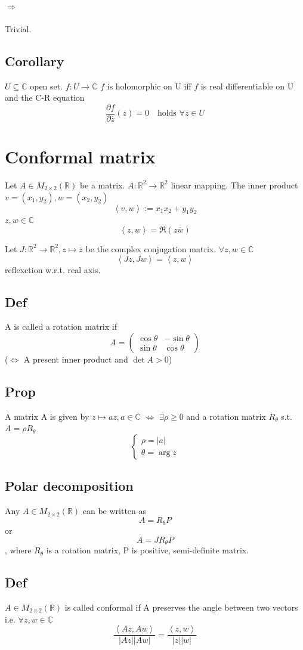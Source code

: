 \documentclass{book}
\newcommand{\abs}[1]{\left\lvert #1 \right\rvert}
\newcommand{\inprod}[2]{\left<#1,#2\right>}
\begin{document}
\subsubsection{$\Rightarrow$}Trivial.
\section{Corollary}
$U\subseteq \mathbb C$ open set. $f:U\rightarrow \mathbb C$ $f$ is holomorphic on U iff $f$ is real differentiable on U and the C-R equation $$\frac{\partial f}{\partial \overline z}(z)=0\quad\text{holds }\forall z\in U$$
\chapter{Conformal matrix}
Let $A\in M_{2\times 2}(\mathbb R)$ be a matrix. $A:\mathbb R^2\rightarrow \mathbb R^2$ linear mapping. The inner product $v=(x_1,y_2),w=(x_2,y_2)$$$\inprod{v}{w}:=x_1x_2+y_1y_2$$$z,w\in \mathbb C$$$\inprod{z}{w}=\Re(z\overline w)$$

Let $J:\mathbb R^2\rightarrow\mathbb R^2, z\mapsto \overline z$ be the complex conjugation matrix. $\forall z,w\in \mathbb C$$$\inprod{Jz}{Jw}=\inprod{z}w$$
reflexction w.r.t. real axis.
\section{Def}A is called a rotation matrix if $$A=\begin{pmatrix}
    \cos\theta &-\sin\theta\\\sin\theta&\cos\theta
\end{pmatrix}$$
($\Leftrightarrow$ A present inner product and $\det A>0$)
\section{Prop}
A matrix A is given by $z\mapsto az,a\in \mathbb C$ $\Leftrightarrow$ $\exists\rho\geq 0$ and a rotation matrix $R_\theta$ s.t. $A=\rho R_\theta$$$\begin{cases}
    \rho=\abs{a}\\\theta=\arg z
\end{cases}$$
\section{Polar decomposition}
Any $A\in M_{2\times 2}(\mathbb R)$ can be written as $$A= R_\theta P$$or $$A=JR_\theta P$$, where $R_\theta$ is a rotation matrix, P is positive, semi-definite matrix.
\section{Def}
$A\in M_{2\times 2}(\mathbb R)$ is called conformal if A preserves the angle between two vectors i.e. $\forall z,w\in \mathbb C$$$\frac{\inprod{Az}{Aw}}{\abs{Az}\abs{Aw}}=\frac{\inprod{z}w}{\abs{z}\abs{w}} $$
\end{document}

